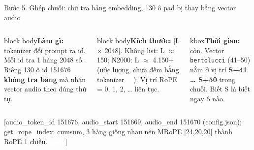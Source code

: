 \documentclass[aspectratio=169,xcolor=table]{beamer}
\newcommand{\src}[1]{\par\vfill{\tiny\color{TextGray}[#1]}}
\newcommand{\bsz}{\footnotesize}%
\newcommand{\nbox}[2][block body]{\begin{beamercolorbox}[sep=0.45em,rounded=true]{#1}\bsz #2\end{beamercolorbox}}
\newcommand{\tagbox}[2]{{\scriptsize\colorbox{#1}{\textcolor{white}{\textbf{#2}}}}}
\newcommand{\CODE}{\tagbox{Secondary}{code}}
\newcommand{\TA}{\tagbox{TextGray}{ta}}
\begin{document}
\begin{frame}{Bước 5. Ghép chuỗi: chữ tra bảng embedding, 130 ô pad bị thay bằng vector audio}
\begin{columns}[T]
\nbox{\textbf{Làm gì:} tokenizer đổi prompt ra id. Mỗi id tra 1 hàng 2048 số. Riêng 130 ô id 151676 \textbf{không tra bảng} mà nhận vector audio theo đúng thứ tự.}
\nbox{\textbf{Kích thước:} [L $\times$ 2048]. Không list: L $\approx$ 150; N2000: L $\approx$ 4.150+ (ước lượng, chưa đếm bằng tokenizer \TA). Vị trí RoPE = 0, 1, 2, … liên tục.}
\nbox[kbox]{\textbf{Thời gian:} còn. Vector \texttt{bertolucci} (41--50) nằm ở vị trí \textbf{S+41 … S+50} trong chuỗi. Biết S là biết ngay ô nào.}
\end{columns}
\src{audio\_token\_id 151676, audio\_start 151669, audio\_end 151670 (config.json); get\_rope\_index: cumsum, 3 hàng giống nhau nên MRoPE [24,20,20] thành RoPE 1 chiều. \CODE}
\end{frame}
\end{document}
